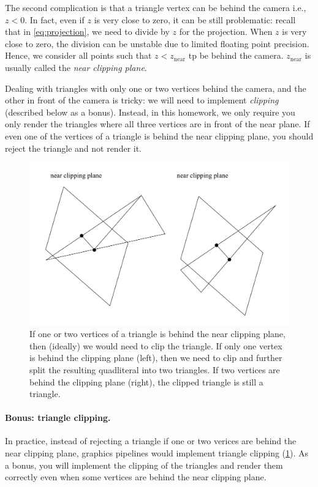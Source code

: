 The second complication is that a triangle vertex can be behind the camera i.e., $z < 0$. In fact, even if $z$ is very close to zero, it can be still problematic: recall that in \cref{eq:projection}, we need to divide by $z$ for the projection. When $z$ is very close to zero, the division can be unstable due to limited floating point precision. Hence, we consider all points such that $z < z_{\text{near}}$ tp be behind the camera. $z_{\text{near}}$ is usually called the \emph{near clipping plane}.

Dealing with triangles with only one or two vertices behind the camera, and the other in front of the camera is tricky: we will need to implement \emph{clipping} (described below as a bonus). Instead, in this homework, we only require you only render the triangles where all three vertices are in front of the near plane. If even one of the vertices of a triangle is behind the near clipping plane, you should reject the triangle and not render it.

\begin{figure}[h]
    \centering
    \includegraphics[width=0.7\linewidth]{imgs/triangle_clipping.pdf}
    \caption{If one or two vertices of a triangle is behind the near clipping plane, then (ideally) we would need to clip the triangle. If only one vertex is behind the clipping plane (left), then we need to clip and further split the resulting quadliteral into two triangles. If two vertices are behind the clipping plane (right), the clipped triangle is still a triangle.}
    \label{fig:triangle_clipping}
\end{figure}

\paragraph{Bonus: triangle clipping.} In practice, instead of rejecting a triangle if one or two verices are behind the near clipping plane, graphics pipelines would implement triangle clipping (\cref{fig:triangle_clipping}). As a bonus, you will implement the clipping of the triangles and render them correctly even when some vertices are behind the near clipping plane.

